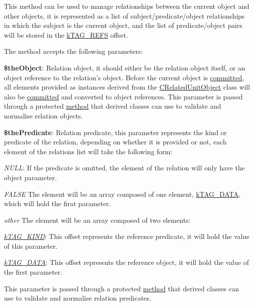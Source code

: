 This method can be used to manage relationships between the current object and other objects, it is represented as a list of subject/predicate/object relationships in which the subject is the current object, and the list of predicate/object pairs will be stored in the \hyperlink{}{k\-T\-A\-G\-\_\-\-R\-E\-F\-S} offset.

The method accepts the following parameters\-:


\begin{DoxyItemize}
\item {\bfseries \$the\-Object}\-: Relation object, it should either be the relation object itself, or an object reference to the relation's object. Before the current object is \hyperlink{class_c_persistent_object_a88b1f2b11d3d60e0b3d33d8b0649b68a}{committed}, all elements provided as instances derived from the \hyperlink{class_c_related_unit_object}{C\-Related\-Unit\-Object} class will also be \hyperlink{class_c_persistent_unit_object_ae74127a9fb936d8cf5aeed30315ac05b}{committed} and converted to object references. This parameter is passed through a protected \hyperlink{class_c_persistent_unit_object_abdf69880df0ce8257c4d0fd64adc7053}{method} that derived classes can use to validate and normalise relation objects. 
\item {\bfseries \$the\-Predicate}\-: Relation predicate, this parameter represents the kind or predicate of the relation, depending on whether it is provided or not, each element of the relations list will take the following form\-: 
\begin{DoxyItemize}
\item {\itshape N\-U\-L\-L}\-: If the predicate is omitted, the element of the relation will only have the object parameter. 
\item {\itshape F\-A\-L\-S\-E} The element will be an array composed of one element, \hyperlink{}{k\-T\-A\-G\-\_\-\-D\-A\-T\-A}, which will hold the firat parameter. 
\item {\itshape other} The element will be an array composed of two elements\-: 
\begin{DoxyItemize}
\item {\itshape \hyperlink{}{k\-T\-A\-G\-\_\-\-K\-I\-N\-D}}\-: This offset represents the reference predicate, it will hold the value of this parameter. 
\item {\itshape \hyperlink{}{k\-T\-A\-G\-\_\-\-D\-A\-T\-A}}\-: This offset represents the reference object, it will hold the value of the first parameter. 
\end{DoxyItemize}This parameter is passed through a protected \hyperlink{class_c_persistent_unit_object_ada043fb875e4ec40b6c36eef689ab2a6}{method} that derived classes can use to validate and normalise relation predicates. 

\end{DoxyItemize}
\end{DoxyItemize}
